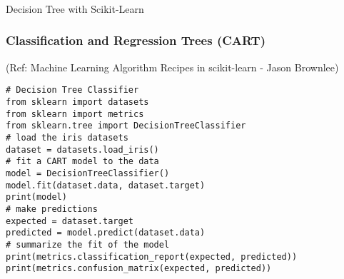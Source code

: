 \begin{frame}[fragile]\frametitle{}
\begin{center}
{\Large Decision Tree with Scikit-Learn}
\end{center}
\end{frame}

\begin{frame}[fragile]\frametitle{Classification and Regression Trees (CART)}
{\tiny (Ref: Machine Learning Algorithm Recipes in scikit-learn - Jason Brownlee)}

\begin{lstlisting}
# Decision Tree Classifier
from sklearn import datasets
from sklearn import metrics
from sklearn.tree import DecisionTreeClassifier
# load the iris datasets
dataset = datasets.load_iris()
# fit a CART model to the data
model = DecisionTreeClassifier()
model.fit(dataset.data, dataset.target)
print(model)
# make predictions
expected = dataset.target
predicted = model.predict(dataset.data)
# summarize the fit of the model
print(metrics.classification_report(expected, predicted))
print(metrics.confusion_matrix(expected, predicted))
\end{lstlisting}


\end{frame}









